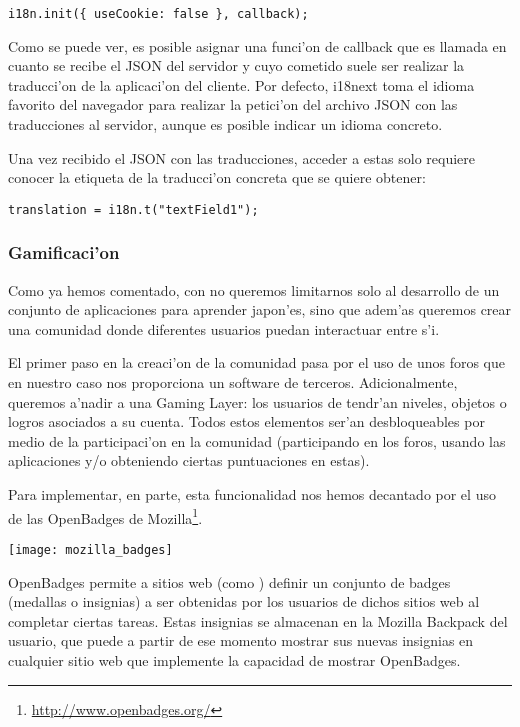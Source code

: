 \begin{verbatim}
i18n.init({ useCookie: false }, callback);
\end{verbatim}

Como se puede ver, es posible asignar una funci'on de callback que es llamada en cuanto se recibe el JSON del
servidor y cuyo cometido suele ser realizar la traducci'on de la aplicaci'on del cliente.
Por defecto, i18next toma el idioma favorito del navegador para realizar la petici'on del archivo JSON con las
traducciones al servidor, aunque es posible indicar un idioma concreto.

Una vez recibido el JSON con las traducciones, acceder a estas solo requiere conocer la etiqueta de la traducci'on
concreta que se quiere obtener:

\begin{verbatim}
translation = i18n.t("textField1");
\end{verbatim}

\subsubsection[Gamificaci'on (SBP)]{Gamificaci'on}
\label{sub:gamificacion}

Como ya hemos comentado, con \Nipponline{} no queremos limitarnos solo al desarrollo de un conjunto de aplicaciones para
aprender japon'es, sino que adem'as queremos crear una comunidad donde diferentes usuarios puedan interactuar entre
s'i.

El primer paso en la creaci'on de la comunidad pasa por el uso de unos foros que en nuestro caso nos proporciona un
software de terceros. 
Adicionalmente, queremos a'nadir a \Nipponline{} una Gaming Layer: los usuarios de \Nipponline{} tendr'an niveles, objetos
o logros asociados a su cuenta. Todos estos elementos ser'an desbloqueables por medio de la participaci'on en la
comunidad (participando en los foros, usando las aplicaciones y/o obteniendo ciertas puntuaciones en estas).

Para implementar, en parte, esta funcionalidad nos hemos decantado por el uso de las OpenBadges de 
Mozilla\footnote{\url{http://www.openbadges.org/}}.

\begin{center}
\texttt{[image: mozilla\_badges]}
\end{center}

OpenBadges permite a sitios web (como \Nipponline{}) definir un conjunto de badges (medallas o insignias) a ser 
obtenidas por los usuarios de dichos sitios web al completar ciertas tareas. Estas insignias se almacenan en la
Mozilla Backpack del usuario, que puede a partir de ese momento mostrar sus nuevas insignias en cualquier sitio web
que implemente la capacidad de mostrar OpenBadges. 

